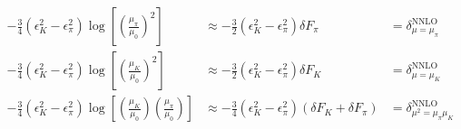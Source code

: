 \documentclass[prd,tightenlines,preprintnumbers,showpacs,superscriptaddress,notitlepage,eqsecnum,floatfix,notitlepage]{revtex4-1}
\begin{document}
\begin{align}
- \frac 34 \left( \epsilon_K^2 -  \epsilon_\pi^2 \right) \log \left[ \left( \frac{\mu_\pi}{\mu_0} \right)^2 \right] &\approx
- \frac 32 \left( \epsilon_K^2 -  \epsilon_\pi^2 \right)  \delta F_\pi \nonumber 
&= \delta^\text{NNLO}_{\mu=\mu_\pi} \, \, \, \, \, \, \, \,
\\
  - \frac 34 \left( \epsilon_K^2 -  \epsilon_\pi^2 \right)  \log \left[ \left( \frac{\mu_K}{\mu_0} \right)^2 \right] &\approx
 - \frac 32 \left( \epsilon_K^2 -  \epsilon_\pi^2 \right) \delta F_K \nonumber 
 &= \delta^\text{NNLO}_{\mu=\mu_K} \, \, \, \, \, \, \, \,
 \\
    - \frac 34 \left( \epsilon_K^2 -  \epsilon_\pi^2 \right) \log \left[ \left( \frac{\mu_K}{\mu_0} \right) \left( \frac{\mu_\pi}{\mu_0} \right)\right] &\approx
  - \frac 34 \left( \epsilon_K^2 -  \epsilon_\pi^2 \right) \left( \delta F_K  + \delta F_\pi  \right) 
  &= \delta^\text{NNLO}_{\mu^2=\mu_\pi \mu_K}
\end{align} 



\newpage
\end{document}
